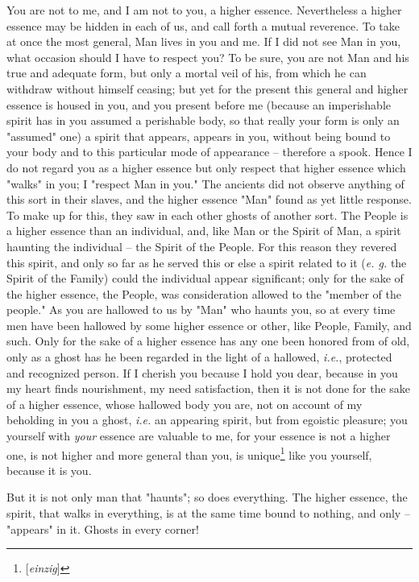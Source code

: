 \documentclass[a4paper]{book}
\begin{document}
You are not to me, and I am not to you, a higher essence. Nevertheless a 
higher essence may be hidden in each of us, and call forth a mutual reverence. 
To take at once the most general, Man lives in you and me. If I did not see 
Man in you, what occasion should I have to respect you? To be sure, you are 
not Man and his true and adequate form, but only a mortal veil of his, from 
which he can withdraw without himself ceasing; but yet for the present this 
general and higher essence is housed in you, and you present before me 
(because an imperishable spirit has in you assumed a perishable body, so that 
really your form is only an "{}assumed"{} one) a spirit that appears, appears 
in you, without being bound to your body and to this particular mode of 
appearance -- therefore a spook. Hence I do not regard you as a higher essence 
but only respect that higher essence which "{}walks"{} in you; I "{}respect 
Man in you."{} The ancients did not observe anything of this sort in their 
slaves, and the higher essence "{}Man"{} found as yet little response. To make 
up for this, they saw in each other ghosts of another sort. The People is a 
higher essence than an individual, and, like Man or the Spirit of Man, a 
spirit haunting the individual -- the Spirit of the People. For this reason 
they revered this spirit, and only so far as he served this or else a spirit 
related to it (\textit{e. g.} the Spirit of the Family) could the individual 
appear significant; only for the sake of the higher essence, the People, was 
consideration allowed to the "{}member of the people."{} As you are hallowed 
to us by "{}Man"{} who haunts you, so at every time men have been hallowed by 
some higher essence or other, like People, Family, and such. Only for the sake 
of a higher essence has any one been honored from of old, only as a ghost has 
he been regarded in the light of a hallowed, \textit{i.e.}, protected and 
recognized person. If I cherish you because I hold you dear, because in you my 
heart finds nourishment, my need satisfaction, then it is not done for the 
sake of a higher essence, whose hallowed body you are, not on account of my 
beholding in you a ghost, \textit{i.e.} an appearing spirit, but from egoistic 
pleasure; you yourself with \textit{your} essence are valuable to me, for your 
essence is not a higher one, is not higher and more general than you, is 
unique\footnote{[\textit{einzig}]} like you yourself, because it is you.

But it is not only man that "{}haunts"{}; so does everything. The higher 
essence, the spirit, that walks in everything, is at the same time bound to 
nothing, and only -- "{}appears"{} in it. Ghosts in every corner!
\end{document}
